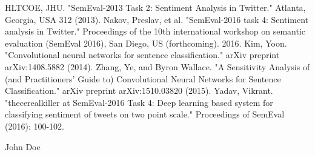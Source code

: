 \documentclass[conference]{IEEEtran}
\begin{document}
%
%
%
\begin{thebibliography}{1}

HLTCOE, JHU. "SemEval-2013 Task 2: Sentiment Analysis in Twitter." Atlanta, Georgia, USA 312 (2013).
Nakov, Preslav, et al. "SemEval-2016 task 4: Sentiment analysis in Twitter." Proceedings of the 10th international workshop on semantic evaluation (SemEval 2016), San Diego, US (forthcoming). 2016.
Kim, Yoon. "Convolutional neural networks for sentence classification." arXiv preprint arXiv:1408.5882 (2014).
Zhang, Ye, and Byron Wallace. "A Sensitivity Analysis of (and Practitioners' Guide to) Convolutional Neural Networks for Sentence Classification." arXiv preprint arXiv:1510.03820 (2015).
Yadav, Vikrant. "thecerealkiller at SemEval-2016 Task 4: Deep learning based system for classifying sentiment of tweets on two point scale." Proceedings of SemEval (2016): 100-102.

\end{thebibliography}

% 

\begin{IEEEbiography}{John Doe}
\blindtext
\end{IEEEbiography}







\end{document}
